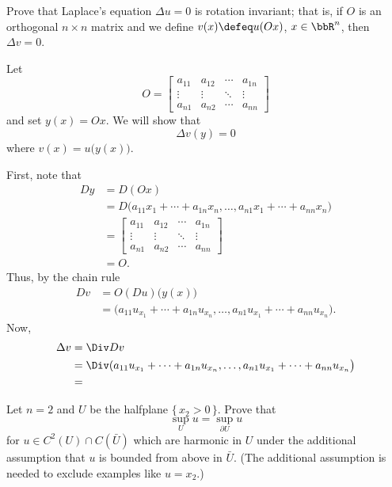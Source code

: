 \begin{problem}
  Prove that Laplace's equation \(\Delta u=0\) is rotation invariant; that
  is, if \(O\) is an orthogonal \(n\times n\) matrix and we define
  \(v(x)\defeq u(Ox)\), \(x\in\bbR^n\), then \(\Delta v=0\).
\end{problem}
\begin{solution}
  Let
  \[
    O=\begin{bmatrix}
      a_{11}&a_{12}&\cdots&a_{1n}\\
      \vdots&\vdots&\ddots&\vdots\\
      a_{n1}&a_{n2}&\cdots&a_{nn}
    \end{bmatrix}
  \]
  and set \(y(x)=Ox\). We will show that
  \[
    \Delta v(y)=0
  \]
  where \(v(x)=u\bigl(y(x)\bigr)\).

  First, note that
  \begin{align*}
    Dy
    &=D(Ox)\\
    &=D\bigl(a_{11}x_1+\dotsb+a_{1n}x_n,\dotsc,a_{n1}x_1+\dotsb+a_{nn}x_n\bigr)\\
    &=
      \begin{bmatrix}
        a_{11}&a_{12}&\cdots&a_{1n}\\
        \vdots&\vdots&\ddots&\vdots\\
        a_{n1}&a_{n2}&\cdots&a_{nn}
      \end{bmatrix}\\
    &=O.
  \end{align*}
  Thus, by the chain rule
  \begin{align*}
    Dv
    &=O(D u)\bigl(y(x)\bigr)\\
    &=\bigl(a_{11}u_{x_1}+\dotsb+a_{1n}u_{x_n},\dotsc,a_{n1}u_{x_1}+\dotsb+a_{nn}u_{x_n}\bigr).
  \end{align*}
  Now,
  \begin{align*}
    \Delta v
    &=\Div D v\\
    &=\Div(a_{11}u_{x_1}+\dotsb+a_{1n}u_{x_n},\dotsc,a_{n1}u_{x_1}+\dotsb+a_{nn}u_{x_n}\bigr)\\
    &=
  \end{align*}
\end{solution}
\newpage

\begin{problem}
  Let \(n=2\) and \(U\) be the halfplane \(\{\,x_2>0\,\}\). Prove that
  \[
    \sup_U u=\sup_{\partial U}u
  \]
  for \(u\in C^2(U)\cap C(\bar U)\) which are harmonic in \(U\) under the
  additional assumption that \(u\) is bounded from above in \(\bar
  U\). (The additional assumption is needed to exclude examples like
  \(u=x_2\).)

\end{problem}
\begin{solution}
\end{solution}
\newpage

